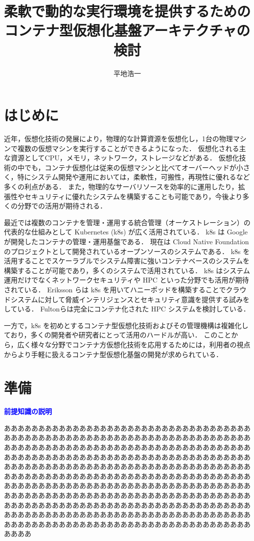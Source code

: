 \documentclass[dvipdfmx]{cs-handout}
\title{柔軟で動的な実行環境を提供するための\\コンテナ型仮想化基盤アーキテクチャの検討}
\author{平地浩一}
\newcommand{\Note}[1]{\noindent \textbf{\textcolor{blue}{#1}}}
\begin{document}
\maketitle

\section{はじめに}

近年，仮想化技術の発展により，物理的な計算資源を仮想化し，1台の物理マシンで複数の仮想マシンを実行することができるようになった．
仮想化される主な資源としてCPU，メモリ，ネットワーク，ストレージなどがある．
仮想化技術の中でも，コンテナ仮想化は従来の仮想マシンと比べてオーバーヘッドが小さく，特にシステム開発や運用においては，柔軟性，可搬性，再現性に優れるなど多くの利点がある．
また，物理的なサーバリソースを効率的に運用したり，拡張性やセキュリティに優れたシステムを構築することも可能であり，今後より多くの分野での活用が期待される．

最近では複数のコンテナを管理・運用する統合管理（オーケストレーション）の代表的な仕組みとして Kubernetes (k8s) が広く活用されている．
k8s は Google が開発したコンテナの管理・運用基盤である．
現在は Cloud Native Foundation のプロジェクトとして開発されているオープンソースのシステムである\cite{k8s}．
k8s を活用することでスケーラブルでシステム障害に強いコンテナベースのシステムを構築することが可能であり，多くのシステムで活用されている．
k8s はシステム運用だけでなくネットワークセキュリティや HPC といった分野でも活用が期待されている．
Eriksson らは k8s を用いてハニーポッドを構築することでクラウドシステムに対して脅威インテリジェンスとセキュリティ意識を提供する試みをしている\cite{Eriksson2023}．
Fultonらは完全にコンテナ化された HPC システムを検討している\cite{Fulton2023}．

一方で，k8s を初めとするコンテナ型仮想化技術およびその管理機構は複雑化しており，多くの開発者や研究者にとって活用のハードルが高い．
このことから，広く様々な分野でコンテナ方仮想化技術を応用するためには，利用者の視点からより手軽に扱えるコンテナ型仮想化基盤の開発が求められている．

\section{準備}
\Note{前提知識の説明}

ああああああああああああああああああああああああああああああああああああ
ああああああああああああああああああああああああああああああああああああ
ああああああああああああああああああああああああああああああああああああ
ああああああああああああああああああああああああああああああああああああ
ああああああああああああああああああああああああああああああああああああ
ああああああああああああああああああああああああああああああああああああ
ああああああああああああああああああああああああああああああああああああ
ああああああああああああああああああああああああああああああああああああ
ああああああああああああああああああああああああああああああああああああ
ああああああああああああああああああああああああああああああああああああ
ああああああああああああああああああああああああああああああああああああ
ああああ
\end{document}
